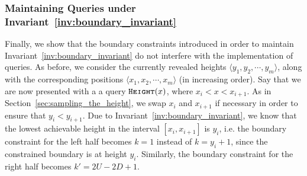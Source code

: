\subsubsection{Maintaining  Queries under Invariant~\ref{inv:boundary_invariant}}
\label{sec:maintaining_height_queries_under_invariant}
Finally, we show that the boundary constraints introduced in order to maintain Invariant~\ref{inv:boundary_invariant}
do not interfere with the implementation of  queries.
As before, we consider the currently revealed heights $ \langle y_1, y_2,\cdots, y_m \rangle$,
along with the corresponding positions $ \langle x_1, x_2,\cdots, x_m \rangle$ (in increasing order).
Say that we are now presented with a a query $\texttt{\textsc{Height}}(x)$, where $x_i < x < x_{i+1}$.
As in Section~\ref{sec:sampling_the_height}, we swap $x_i$ and $x_{i+1}$ if necessary in order to ensure that $y_i < y_{i+1}$.
Due to Invariant~\ref{inv:boundary_invariant}, we know that the lowest achievable height in the interval $[x_i, x_{i+1}]$ is $y_i$,
i.e. the boundary constraint for the left half becomes $k = 1$ instead of $k = y_i + 1$, since the constrained boundary is at height $y_i$.
Similarly, the boundary constraint for the right half becomes $k' = 2U - 2D + 1$.

